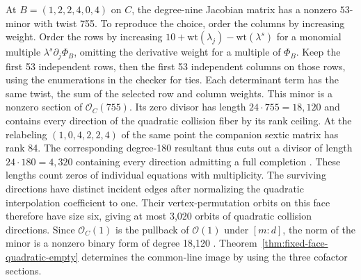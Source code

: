 At \(B=(1,2,2,4,0,4)\) on \(C\), the degree-nine Jacobian matrix has
a nonzero \(53\)-minor with twist 755. To reproduce the choice,
order the columns by increasing weight. Order the rows by increasing
\(10+\mathrm{wt}(\lambda_j)-\mathrm{wt}(\lambda^s)\) for a monomial
multiple \(\lambda^s\partial_j\Phi_B\), omitting the derivative weight
for a multiple of \(\Phi_B\). Keep the first 53 independent rows, then
the first 53 independent columns on those rows, using the enumerations
in the checker for ties. Each determinant term has the same twist,
the sum of the selected row and column weights. This minor is a nonzero
section of \(\mathcal O_C(755)\). Its zero divisor has length
\(24\cdot755=18{,}120\) and contains every direction of the quadratic
collision fiber by its rank ceiling. At the relabeling \((1,0,4,2,2,4)\) of the same point the companion
sextic matrix has rank 84. The corresponding degree-180 resultant thus
cuts out a divisor of length \(24\cdot180=4{,}320\) containing every
direction admitting a full completion \cite{stacksCurveDegrees}.
These lengths count zeros of individual equations with multiplicity.
The surviving directions have distinct incident edges after normalizing
the quadratic interpolation coefficient to one. Their vertex-permutation
orbits on this face therefore have size six, giving at most 3,020 orbits
of quadratic collision directions.
Since \(\mathcal O_C(1)\) is the pullback of \(\mathcal O(1)\) under
\([m:d]\), the norm of the minor is a nonzero binary form of degree
18,120 \cite{stacksFiniteNorm}. Theorem~\ref{thm:fixed-face-quadratic-empty}
determines the common-line image by using the three cofactor sections.


